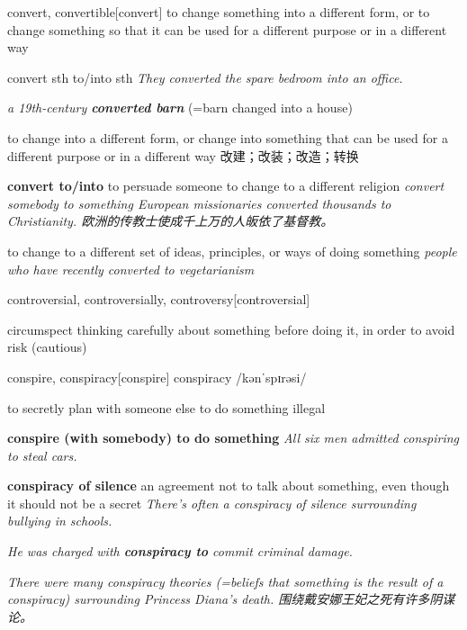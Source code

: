 \begin{DefWord}{convert, convertible}[convert]
    to change something into a different form, or to change something so that it can be used for a different purpose or in a different way

    convert sth to/into sth
    \textit{They converted the spare bedroom into an office.}

    \textit{a 19th-century \textbf{converted barn}} (=barn changed into a house)

    to change into a different form, or change into something that can be used for a different purpose or in a different way 改建；改装；改造；转换

    \textbf{convert to/into}
    to persuade someone to change to a different religion
    \textit{convert somebody to something
    European missionaries converted thousands to Christianity. 欧洲的传教士使成千上万的人皈依了基督教。 }

    to change to a different set of ideas, principles, or ways of doing something
    \textit{people who have recently converted to vegetarianism}
\end{DefWord}

\begin{DefWord}{controversial, controversially, controversy}[controversial]
\end{DefWord}

\begin{DefWord}{circumspect}
    thinking carefully about something before doing it, in order to avoid risk (cautious)
\end{DefWord}

\begin{DefWord}{conspire, conspiracy}[conspire]
    conspiracy /kənˈspɪrəsi/

    to secretly plan with someone else to do something illegal

    \textbf{conspire (with somebody) to do something}
    \textit{All six men admitted conspiring to steal cars.}

    \textbf{conspiracy of silence} an agreement not to talk about something, even though it should not be a secret
    \textit{There's often a conspiracy of silence surrounding bullying in schools.}

    \textit{He was charged with \textbf{conspiracy to} commit criminal damage.}

    \textit{There were many conspiracy theories (=beliefs that something is the result of a conspiracy) surrounding Princess Diana's death. 围绕戴安娜王妃之死有许多阴谋论。 }
\end{DefWord}

